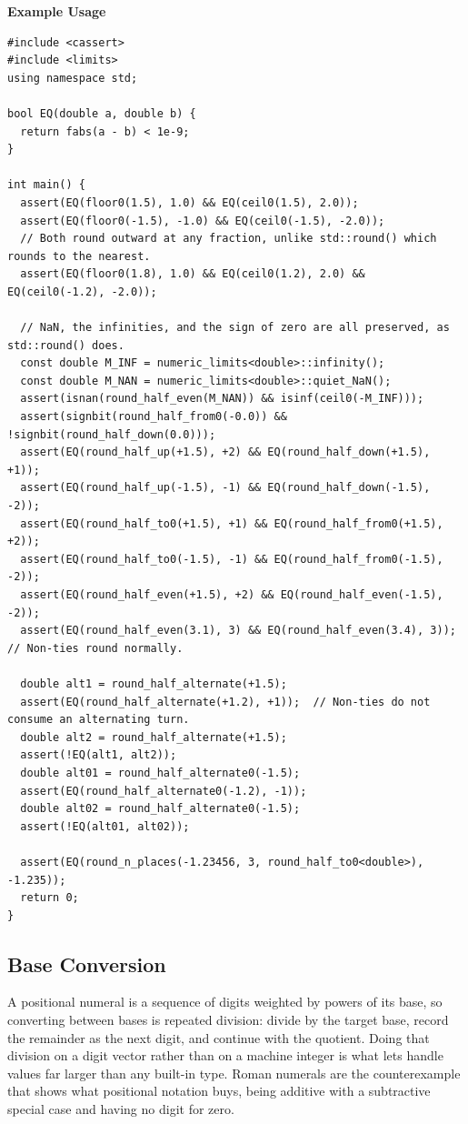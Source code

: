 \textbf{Example Usage}\par
\begin{lstlisting}[style=cpp]
#include <cassert>
#include <limits>
using namespace std;

bool EQ(double a, double b) {
  return fabs(a - b) < 1e-9;
}

int main() {
  assert(EQ(floor0(1.5), 1.0) && EQ(ceil0(1.5), 2.0));
  assert(EQ(floor0(-1.5), -1.0) && EQ(ceil0(-1.5), -2.0));
  // Both round outward at any fraction, unlike std::round() which rounds to the nearest.
  assert(EQ(floor0(1.8), 1.0) && EQ(ceil0(1.2), 2.0) && EQ(ceil0(-1.2), -2.0));

  // NaN, the infinities, and the sign of zero are all preserved, as std::round() does.
  const double M_INF = numeric_limits<double>::infinity();
  const double M_NAN = numeric_limits<double>::quiet_NaN();
  assert(isnan(round_half_even(M_NAN)) && isinf(ceil0(-M_INF)));
  assert(signbit(round_half_from0(-0.0)) && !signbit(round_half_down(0.0)));
  assert(EQ(round_half_up(+1.5), +2) && EQ(round_half_down(+1.5), +1));
  assert(EQ(round_half_up(-1.5), -1) && EQ(round_half_down(-1.5), -2));
  assert(EQ(round_half_to0(+1.5), +1) && EQ(round_half_from0(+1.5), +2));
  assert(EQ(round_half_to0(-1.5), -1) && EQ(round_half_from0(-1.5), -2));
  assert(EQ(round_half_even(+1.5), +2) && EQ(round_half_even(-1.5), -2));
  assert(EQ(round_half_even(3.1), 3) && EQ(round_half_even(3.4), 3));  // Non-ties round normally.

  double alt1 = round_half_alternate(+1.5);
  assert(EQ(round_half_alternate(+1.2), +1));  // Non-ties do not consume an alternating turn.
  double alt2 = round_half_alternate(+1.5);
  assert(!EQ(alt1, alt2));
  double alt01 = round_half_alternate0(-1.5);
  assert(EQ(round_half_alternate0(-1.2), -1));
  double alt02 = round_half_alternate0(-1.5);
  assert(!EQ(alt01, alt02));

  assert(EQ(round_n_places(-1.23456, 3, round_half_to0<double>), -1.235));
  return 0;
}
\end{lstlisting}
\subsection{Base Conversion}
\label{sec:6.1.3}
A positional numeral is a sequence of digits weighted by powers of its base, so converting between bases is repeated division: divide by the target base, record the remainder as the next digit, and continue with the quotient. Doing that division on a digit vector rather than on a machine integer is what lets  handle values far larger than any built-in type. Roman numerals are the counterexample that shows what positional notation buys, being additive with a subtractive special case and having no digit for zero.


